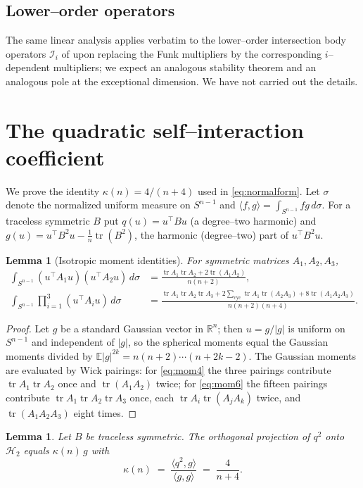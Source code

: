 \documentclass[11pt,reqno]{amsart}
\theoremstyle{plain}
\newtheorem{lemma}[theorem]{Lemma}
\theoremstyle{definition}
\newcommand{\R}{\mathbb{R}}
\newcommand{\Sph}{S^{n-1}}
\newcommand{\IB}{\mathcal{I}}
\newcommand{\Hd}[1]{\mathcal{H}_{#1}}
\newcommand{\abs}[1]{\left\lvert #1 \right\rvert}
\newcommand{\ip}[2]{\langle #1, #2 \rangle}
\DeclareMathOperator{\tr}{tr}
\begin{document}
\subsection{Lower--order operators}
The same linear analysis applies verbatim to the lower--order intersection
body operators $\IB_i$ of \cite{Gardner1994,LinXiong2025} upon replacing the
Funk multipliers by the corresponding $i$--dependent multipliers; we expect an
analogous stability theorem and an analogous pole at the exceptional dimension.
We have not carried out the details.

\appendix
\section{The quadratic self--interaction coefficient}\label{app:symbolic}

We prove the identity $\kappa(n)=4/(n+4)$ used in \eqref{eq:normalform}. Let
$\sigma$ denote the normalized uniform measure on $\Sph$ and
$\ip fg=\int_{\Sph}fg\,d\sigma$. For a traceless symmetric $B$ put
$q(u)=u^\top Bu$ (a degree--two harmonic) and
$g(u)=u^\top B^2u-\tfrac1n\tr(B^2)$, the harmonic (degree--two) part of
$u^\top B^2u$.

\begin{lemma}[Isotropic moment identities]\label{lem:moments}
For symmetric matrices $A_1,A_2,A_3$,
\begin{align}
\int_{\Sph}(u^\top A_1u)(u^\top A_2u)\,d\sigma
&=\frac{\tr A_1\tr A_2+2\tr(A_1A_2)}{n(n+2)},\label{eq:mom4}\\
\int_{\Sph}\prod_{i=1}^{3}(u^\top A_iu)\,d\sigma
&=\frac{\tr A_1\tr A_2\tr A_3
+2\sum_{\text{cyc}}\tr A_1\tr(A_2A_3)+8\tr(A_1A_2A_3)}{n(n+2)(n+4)}.
\label{eq:mom6}
\end{align}
\end{lemma}

\begin{proof}
Let $g$ be a standard Gaussian vector in $\R^n$; then $u=g/\abs g$ is uniform
on $\Sph$ and independent of $\abs g$, so the spherical moments equal the
Gaussian moments divided by $\mathbb E\abs g^{2k}=n(n+2)\cdots(n+2k-2)$. The
Gaussian moments are evaluated by Wick pairings: for \eqref{eq:mom4} the three
pairings contribute $\tr A_1\tr A_2$ once and $\tr(A_1A_2)$ twice; for
\eqref{eq:mom6} the fifteen pairings contribute $\tr A_1\tr A_2\tr A_3$ once,
each $\tr A_i\tr(A_jA_k)$ twice, and $\tr(A_1A_2A_3)$ eight times.
\end{proof}

\begin{lemma}\label{lem:kappa}
Let $B$ be traceless symmetric. The orthogonal projection of $q^2$ onto
$\Hd2$ equals $\kappa(n)\,g$ with
\[
   \kappa(n)\;=\;\frac{\ip{q^2}{g}}{\ip gg}\;=\;\frac{4}{n+4}.
\]
\end{lemma}
\end{document}

